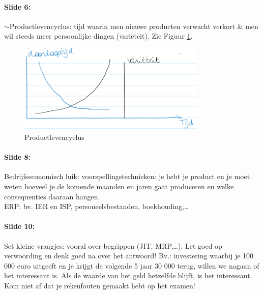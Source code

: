 \documentclass[10pt,a4paper]{report}
\begin{document}
\paragraph{Slide 6:} $\sim$Productlevencyclus: tijd waarin men nieuwe producten verwacht verkort $\&$ men wil steeds meer persoonlijke dingen (vari\"eteit). Zie Figuur \ref{les01_01}.

\begin{figure}[h!]
\centering
\includegraphics[width=90mm]{Les01_01.png}
\caption{Productlevencyclus} 
\label{les01_01}
\end{figure}

\paragraph{Slide 8:} Bedrijfseconomisch luik: voorspellingstechnieken: je hebt je product en je moet weten hoeveel je de komende maanden en jaren gaat produceren en welke consequenties daaraan hangen.\\
ERP: bv. IER en ISP, personeelsbestanden, boekhouding,… 

\paragraph{Slide 10:} Set kleine vraagjes: vooral over begrippen (JIT, MRP,…). Let goed op verwoording en denk goed na over het antwoord! Bv.: investering waarbij je 100 000 euro uitgeeft en je krijgt de volgende 5 jaar 30 000 terug, willen we nagaan of het interessant is. Als de waarde van het geld hetzelfde blijft, is het interessant. Kom niet af dat je rekenfouten gemaakt hebt op het examen!
\end{document}

